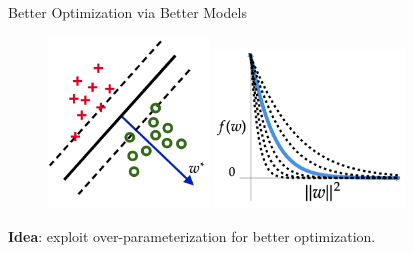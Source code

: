 \documentclass[notheorems]{beamer}
\begin{document}
    \begin{frame}{Better Optimization via Better Models}

        \begin{figure}
            \centering
            \includegraphics[width=0.38\textwidth]{figures/separable}
            \hspace{0.2em}
            \includegraphics[width=0.45\textwidth]{figures/loss_fn}
        \end{figure}
        \vspace{0.2em}

        \begin{center}
            \large \textbf{Idea}: exploit over-parameterization for better optimization.\vspace{0.25em}
        \end{center}

    \end{frame}
\end{document}
